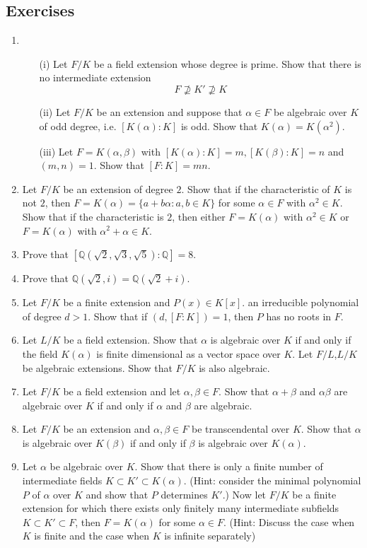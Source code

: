 \subsection{Exercises}
\begin{enumerate}
\item \begin{enumerate}
      \item[(i)] Let $F/K$ be a field extension whose degree is prime. Show that there is no intermediate extension
$$F \not \supseteq K' \not \supseteq K$$
      \item[(ii)] Let $F/K$ be an extension and suppose that $\alpha \in F$ be algebraic over $K$ of odd degree, i.e. $[K(\alpha):K]$ is odd. Show that $K(\alpha)=K(\alpha^2)$.
      \item[(iii)] Let $F=K(\alpha,\beta)$ with $[K(\alpha):K]=m, [K(\beta):K]=n$ and $(m,n)=1$. Show that
      $[F:K]=mn$.
      \end{enumerate}
\item Let $F/K$ be an extension of degree $2$. Show that if the characteristic of $K$ is not $2$, then
      $F=K(\alpha)=\{a+b\alpha: a,b \in K\}$ for some $\alpha \in F$ with $\alpha^2 \in K$. Show that if the characteristic is $2$, then either $F=K(\alpha)$ with $\alpha^2 \in K$ or $F=K(\alpha)$ with $\alpha^2+\alpha \in K$.
\item Prove that $[\mathbb{Q}(\sqrt{2},\sqrt{3},\sqrt{5}):\mathbb{Q}]=8$.
\item Prove that $\mathbb{Q}(\sqrt{2},i)=\mathbb{Q}(\sqrt{2}+i)$.
\item Let $F/K$ be a finite extension and $P(x) \in K[x]$. an irreducible polynomial of degree $d>1$. Show that
      if $(d,[F:K])=1$, then $P$ has no roots in $F$.
\item Let $L/K$ be a field extension. Show that $\alpha$ is algebraic over $K$ if and only if the field $K(\alpha)$
       is finite dimensional as a vector space over $K$. Let $F/L$,$L/K$ be algebraic extensions. Show that $F/K$ is also algebraic.
\item Let $F/K$ be a field extension and let $\alpha,\beta \in F$. Show that $\alpha+\beta$ and $\alpha \beta$ are algebraic over $K$ if and only if $\alpha$ and $\beta$ are algebraic.
\item Let $F/K$ be an extension and $\alpha,\beta \in F$ be transcendental over $K$. Show that $\alpha$ is algebraic over $K(\beta)$ if and only if $\beta$ is algebraic over $K(\alpha)$.
\item Let $\alpha$ be algebraic over $K$. Show that there is only a finite number of intermediate fields $K \subset K' \subset K(\alpha)$. (Hint: consider the minimal polynomial $P$ of $\alpha$ over $K$ and show that $P$ determines $K'$.) Now let $F/K$ be a finite extension for which there exists only finitely many intermediate subfields $K \subset K' \subset F$, then $F=K(\alpha)$ for some $\alpha \in F$. (Hint: Discuss the case when $K$ is finite and the case when $K$ is infinite separately)

\end{enumerate}
